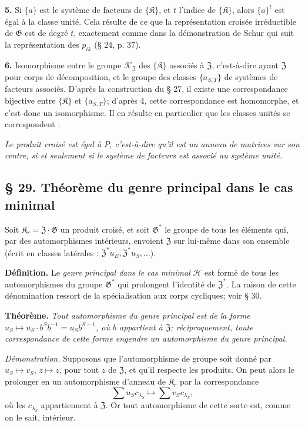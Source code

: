 \noindent\textbf{5.} Si \(\{a\}\) est le système de facteurs de \(\{\mathfrak K\}\), et \(t\) l'indice de \(\{\mathfrak K\}\), alors \(\{a\}^t\) est égal à la classe unité. Cela résulte de ce que la représentation croisée irréductible de \(\mathfrak G\) est de degré \(t\), exactement comme dans la démonstration de Schur qui suit la représentation des \(p_{ik}\) (\S{} 24, p. 37).

\noindent\textbf{6.} Isomorphisme entre le groupe \(\mathscr K_{\mathfrak Z}\) des \(\{\mathfrak K\}\) associés à \(\mathfrak Z\), c'est-à-dire ayant \(\mathfrak Z\) pour corps de décomposition, et le groupe des classes \(\{a_{S,T}\}\) de systèmes de facteurs associés. D'après la construction du \S{} 27, il existe une correspondance bijective entre \(\{\mathfrak K\}\) et \(\{a_{S,T}\}\); d'après 4, cette correspondance est homomorphe, et c'est donc un isomorphisme. Il en résulte en particulier que les classes unités se correspondent :

\noindent\emph{Le produit croisé est égal à \(P\), c'est-à-dire qu'il est un anneau de matrices sur son centre, si et seulement si le système de facteurs est associé au système unité.}

\subsection*{\S{} 29. Théorème du genre principal dans le cas minimal}\label{fr-r823-theoreme-genre-principal-cas-minimal}

Soit \(\mathfrak K_r=\mathfrak Z\cdot\mathfrak G\) un produit croisé, et soit \(\mathfrak G^*\) le groupe de tous les éléments qui, par des automorphismes intérieurs, envoient \(\mathfrak Z\) sur lui-même dans son ensemble (écrit en classes latérales : \(\mathfrak Z^*u_E,\mathfrak Z^*u_S,\ldots\)).

\noindent\textbf{Définition.} Le \og \emph{genre principal dans le cas minimal}\fg{} \(\mathscr H\) est formé de tous les automorphismes du groupe \(\mathfrak G^*\) qui prolongent l'identité de \(\mathfrak Z^*\). La raison de cette dénomination ressort de la spécialisation aux corps cycliques; voir \S{} 30.

\noindent\textbf{Théorème.} \emph{Tout automorphisme du genre principal est de la forme \(u_S\mapsto u_S\cdot b^Sb^{-1}=u_Sb^{S-1}\), où \(b\) appartient à \(\mathfrak Z\); réciproquement, toute correspondance de cette forme engendre un automorphisme du genre principal.}

\noindent\emph{Démonstration.} Supposons que l'automorphisme de groupe soit donné par \(u_S\mapsto v_S\), \(z\mapsto z\), pour tout \(z\) de \(\mathfrak Z\), et qu'il respecte les produits. On peut alors le prolonger en un automorphisme d'anneau de \(\mathfrak K_r\) par la correspondance
\[
\sum u_Sc_{\lambda_S}\mapsto\sum v_Sc_{\lambda_S},
\]
où les \(c_{\lambda_S}\) appartiennent à \(\mathfrak Z\). Or tout automorphisme de cette sorte est, comme on le sait, intérieur.

